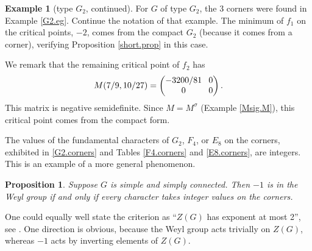 \documentclass[JEP,XML,SOM,Unicode,NoFloatCountersInSection,published]{cedram}
\newtheorem{prop}[equation]{Proposition}
\theoremstyle{definition}
\newtheorem{example}[equation]{Example}
\begin{document}
\begin{example}[type $G_2$, continued] \label{G2.contd}
For $G$ of type $G_2$, the 3 corners were found in Example \ref{G2.eg}. Continue the notation of that example.
The minimum of $f_1$ on the critical points, $-2$, comes from the compact $G_2$ (because it comes from a corner), verifying Proposition \ref{short.prop} in this case.

We remark that the remaining critical point of $f_2$ has
\[\arraycolsep4pt
M(7/9, 10/27) = \begin{pmatrix} -3200/81 & 0 \\ 0 & 0 \end{pmatrix}.
\]
This matrix is negative semidefinite. Since $M = M^\sigma$ (Example \ref{Msig.M}), this critical point comes from the compact form.
\end{example}

The values of the fundamental characters of $G_2$, $F_4$, or $E_8$ on the corners, exhibited in \eqref{G2.corners} and Tables \ref{F4.corners} and \ref{E8.corners}, are integers. This is an example of a more general phenomenon.

\begin{prop}
Suppose $G$ is simple and simply connected. Then $-1$ is in the Weyl group if and only if every character takes integer values on the corners.
\end{prop}

One could equally well state the criterion as ``$Z(G)$ has exponent at most 2'', see \cite[\S{VI.4}, Exer.\,7]{Bou:g4}. One direction is obvious, because the Weyl group acts trivially on $Z(G)$, whereas $-1$ acts by inverting elements of $Z(G)$.
\end{document}
